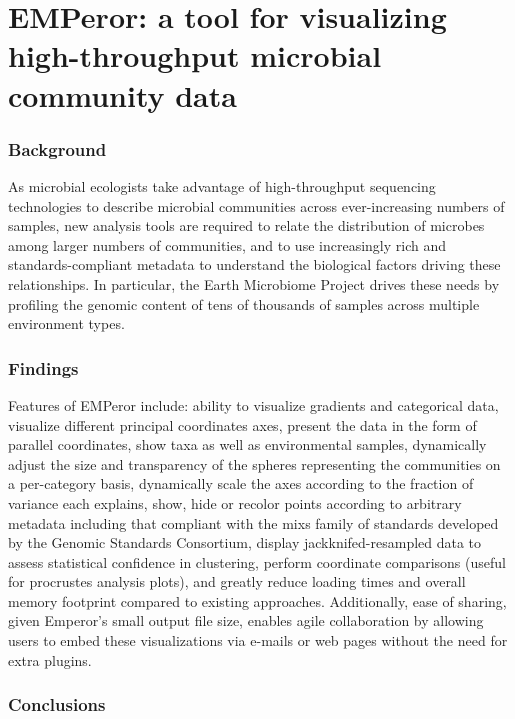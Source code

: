 \section{EMPeror: a tool for visualizing high\hyp{}throughput microbial community data}\label{section_emperor}

\subsubsection{Background}

As microbial ecologists take advantage of high\hyp{}throughput sequencing technologies to describe microbial communities across ever\hyp{}increasing numbers of samples, new analysis tools are required to relate the distribution of microbes among larger numbers of communities, and to use increasingly rich and standards\hyp{}compliant metadata to understand the biological factors driving these relationships. In particular, the Earth Microbiome Project drives these needs by profiling the genomic content of tens of thousands of samples across multiple environment types.  

\subsubsection{Findings}

Features of EMPeror include: ability to visualize gradients and categorical data, visualize different principal coordinates axes, present the data in the form of parallel coordinates, show taxa as well as environmental samples, dynamically adjust the size and transparency of the spheres representing the communities on a per\hyp{}category basis, dynamically scale the axes according to the fraction of variance each explains, show, hide or recolor points according to arbitrary metadata including that compliant with the \gls{mixs} family of standards developed by the Genomic Standards Consortium, display jackknifed\hyp{}resampled data to assess statistical confidence in clustering, perform coordinate comparisons (useful for procrustes analysis plots), and greatly reduce loading times and overall memory footprint compared to existing approaches. Additionally, ease of sharing, given Emperor's small output file size, enables agile collaboration by allowing users to embed these visualizations via e\hyp{}mails or web pages without the need for extra plugins.

\subsubsection{Conclusions}

